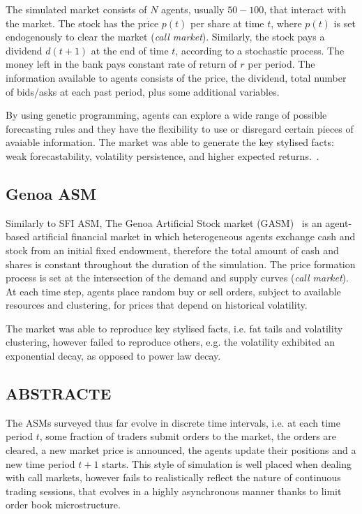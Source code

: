 The simulated market consists of $N$ agents, usually $50-100$, that interact with the market. The stock has the price $p(t)$ per share at time $t$, where $p(t)$ is set endogenously to clear the market (\textit{call market}). Similarly, the stock pays a dividend $d(t+1)$ at the end of time $t$, according to a stochastic process. The money left in the bank pays constant rate of return of $r$ per period. The information available to agents consists of the price, the dividend, total number of bids/asks at each past period, plus some additional variables. 

By using genetic programming, agents can explore a wide range of possible forecasting rules and they have the flexibility to use or disregard certain pieces of avaiable information. The market was able to generate the key stylised facts: weak forecastability, volatility persistence, and higher expected returns.~\cite{Lebaron99}.  

\subsection{Genoa ASM}
Similarly to SFI ASM, The Genoa Artificial Stock market (GASM)~\citep{Raberto2001} is an agent-based artificial financial market in which heterogeneous agents exchange cash and stock from an initial fixed endowment, therefore the total amount of cash and shares is constant throughout the duration of the simulation. The price formation process is set at the intersection of the demand and supply curves (\textit{call market}). At each time step, agents place random buy or sell orders, subject to available resources and clustering, for prices that depend on historical volatility.

The market was able to reproduce key stylised facts, i.e. fat tails and volatility clustering, however failed to reproduce others, e.g. the volatility exhibited an exponential decay, as opposed to power law decay.

\subsection{ABSTRACTE}
The ASMs surveyed thus far evolve in discrete time intervals, i.e. at each time period $t$, some fraction of traders submit orders to the market, the orders are cleared, a new market price is announced, the agents update their positions and a new time period $t+1$ starts. This style of simulation is well placed when dealing with call markets, however fails to realistically reflect the nature of continuous trading sessions, that evolves in a highly asynchronous manner thanks to limit order book microstructure.  


